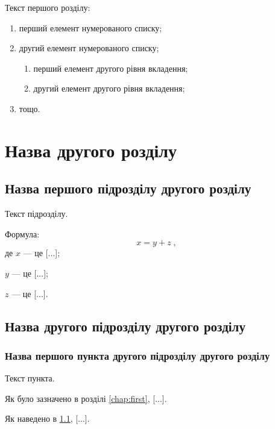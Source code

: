 \documentclass{dstu}
\begin{document}
Текст першого розділу:
\begin{enumerate}
	\item перший елемент нумерованого списку;
	\item другий елемент нумерованого списку;
	\begin{enumerate}
		\item перший елемент другого рівня вкладення;
		\item другий елемент другого рівня вкладення;
	\end{enumerate}
	\item тощо.
\end{enumerate}

\chapter{Назва другого розділу}
\label{chap:second}

\section{Назва першого підрозділу другого розділу}
\label{sec:secondfirst}

Текст підрозділу.

Формула:
\begin{equation}
x = y + z\;,
\label{eq:equation1}
\end{equation}
де $x$ --- це [...];

$y$ --- це [...];

$z$ --- це [...].

\section{Назва другого підрозділу другого розділу}
\label{sec:secondsecond}

\subsection{Назва першого пункта другого підрозділу другого розділу}
\label{subsec:secondsecondfirst}

Текст пункта.

Як було зазначено в розділі \ref{chap:first}, [...].

Як наведено в \ref{sec:secondfirst}, [...].
\end{document}
